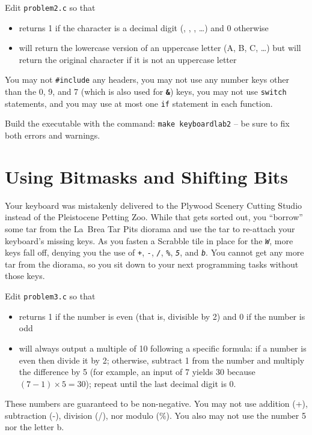 Edit \texttt{problem2.c} so that
\begin{itemize}
\item {} returns 1 if the character is a decimal digit
    (\textquotesingle, \textquotesingle,
    \textquotesingle, \dots) and 0 otherwise
\item {} will return the lowercase version of an
    uppercase letter (\textquotesingle A\textquotesingle, \textquotesingle
    B\textquotesingle, \textquotesingle C\textquotesingle, \dots) but will
    return the original character if it is not an uppercase letter
\end{itemize}
You may not \lstinline{#include} any headers, you may not use any number keys
other than the 0, 9, and 7 (which is also used for \textbf{\texttt{\&}}) keys,
you may not use \lstinline{switch} statements, and you may use at most one
\lstinline{if} statement in each function.

Build the executable with the command: \texttt{make keyboardlab2} -- be sure to
fix both errors and warnings.


\section{Using Bitmasks and Shifting Bits}

Your keyboard was mistakenly delivered to the Plywood Scenery Cutting Studio
instead of the Pleistocene Petting Zoo. While that gets sorted out, you
``borrow'' some tar from the La~Brea Tar Pits diorama and use the tar to
re-attach your keyboard's missing keys. As you fasten a Scrabble tile in place
for the \textit{\texttt{W}}, more keys fall off, denying you the use of
\textit{\texttt{+}}, \textit{\texttt{-}}, \textit{\texttt{/}},
\textit{\texttt{\%}}, \textit{\texttt{5}}, and \textit{\texttt{b}}. You cannot
get any more tar from the diorama, so you sit down to your next programming
tasks without those keys.

Edit \texttt{problem3.c} so that
\begin{itemize}
\item {} returns 1 if the number is even (that is,
    divisible by 2) and 0 if the number is odd
\item {} will always output a multiple of
    10 following a specific formula: if a number is even then divide it by
    2; otherwise, subtract 1 from the number and multiply the difference
    by 5 (for example, an input of 7 yields 30 because $(7-1) \times 5 = 30$);
    repeat until the last decimal digit is 0.
\end{itemize}
These numbers are guaranteed to be non-negative. You may not use addition (+),
subtraction (-), division (/), nor modulo (\%). You also may not use the
number 5 nor the letter b.

